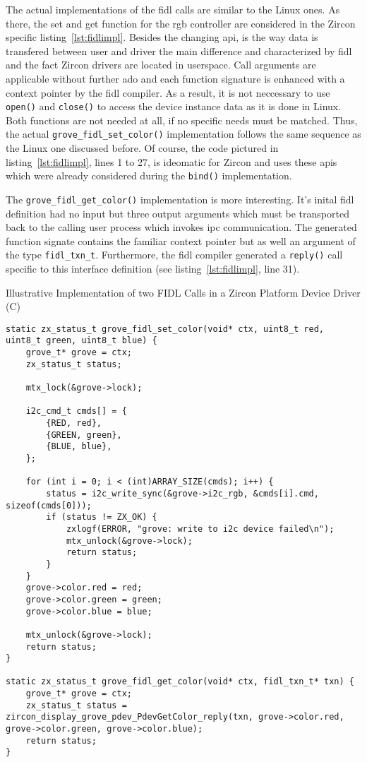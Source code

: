 The actual implementations of the \ac{fidl} calls are similar to the Linux ones.
As there, the set and get function for the \ac{rgb} controller are considered in the Zircon specific listing~\ref{lst:fidlimpl}.
Besides the changing \ac{api}, is the way data is transfered between user and driver the main difference and characterized by \ac{fidl} and the fact Zircon drivers are located in userspace.
Call arguments are applicable without further ado and each function signature is enhanced with a context pointer by the \ac{fidl} compiler.
As a result, it is not neccessary to use \texttt{open()} and \texttt{close()} to access the device instance data as it is done in Linux.
Both functions are not needed at all, if no specific needs must be matched.
Thus, the actual \texttt{grove_fidl_set_color()} implementation follows the same sequence as the Linux one discussed before.
Of course, the code pictured in listing~\ref{lst:fidlimpl}, lines 1 to 27, is ideomatic for Zircon and uses these \acp{api} which were already considered during the \texttt{bind()} implementation.

The \texttt{grove_fidl_get_color()} implementation is more interesting.
It's inital \ac{fidl} definition had no input but three output arguments which must be transported back to the calling user process which invokes \ac{ipc} communication.
The generated function signate contains the familiar context pointer but as well an argument of the type \texttt{fidl_txn_t}.
Furthermore, the \ac{fidl} compiler generated a \texttt{reply()} call specific to this interface definition (see listing~\ref{lst:fidlimpl}, line 31).

\begin{listing} [H]
    \caption{Illustrative Implementation of two FIDL Calls in a Zircon Platform Device Driver (C)}
\label{lst:fidlimpl}
\begin{verbatim}
static zx_status_t grove_fidl_set_color(void* ctx, uint8_t red, uint8_t green, uint8_t blue) {
    grove_t* grove = ctx;
    zx_status_t status;

    mtx_lock(&grove->lock);

    i2c_cmd_t cmds[] = {
        {RED, red},
        {GREEN, green},
        {BLUE, blue},
    };

    for (int i = 0; i < (int)ARRAY_SIZE(cmds); i++) {
        status = i2c_write_sync(&grove->i2c_rgb, &cmds[i].cmd, sizeof(cmds[0]));
        if (status != ZX_OK) {
            zxlogf(ERROR, "grove: write to i2c device failed\n");
            mtx_unlock(&grove->lock);
            return status;
        }
    }
    grove->color.red = red;
    grove->color.green = green;
    grove->color.blue = blue;

    mtx_unlock(&grove->lock);
    return status;
}

static zx_status_t grove_fidl_get_color(void* ctx, fidl_txn_t* txn) {
    grove_t* grove = ctx;
    zx_status_t status = zircon_display_grove_pdev_PdevGetColor_reply(txn, grove->color.red, grove->color.green, grove->color.blue);
    return status;
}
\end{verbatim}
\end{listing}

